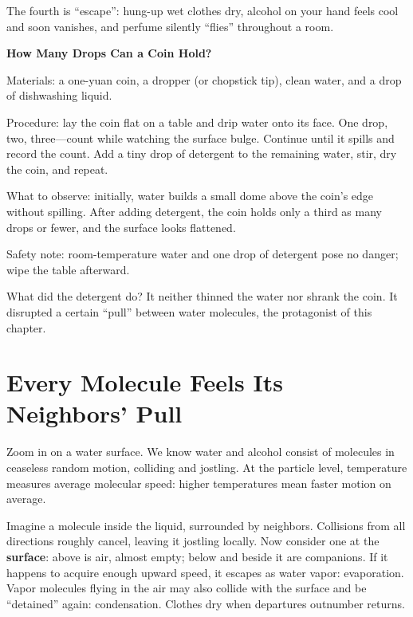 The fourth is ``escape'': hung-up wet clothes dry, alcohol on your hand feels cool and soon vanishes, and perfume silently ``flies'' throughout a room.

\begin{shiyan}
\textbf{How Many Drops Can a Coin Hold?}

Materials: a one-yuan coin, a dropper (or chopstick tip), clean water, and a drop of dishwashing liquid.

Procedure: lay the coin flat on a table and drip water onto its face. One drop, two, three---count while watching the surface bulge. Continue until it spills and record the count. Add a tiny drop of detergent to the remaining water, stir, dry the coin, and repeat.

What to observe: initially, water builds a small dome above the coin's edge without spilling. After adding detergent, the coin holds only a third as many drops or fewer, and the surface looks flattened.

Safety note: room-temperature water and one drop of detergent pose no danger; wipe the table afterward.
\end{shiyan}

What did the detergent do? It neither thinned the water nor shrank the coin. It disrupted a certain ``pull'' between water molecules, the protagonist of this chapter.

\section{Every Molecule Feels Its Neighbors' Pull}

Zoom in on a water surface. We know water and alcohol consist of molecules in ceaseless random motion, colliding and jostling. At the particle level, temperature measures average molecular speed: higher temperatures mean faster motion on average.

Imagine a molecule inside the liquid, surrounded by neighbors. Collisions from all directions roughly cancel, leaving it jostling locally. Now consider one at the \textbf{surface}: above is air, almost empty; below and beside it are companions. If it happens to acquire enough upward speed, it escapes as water vapor: evaporation. Vapor molecules flying in the air may also collide with the surface and be ``detained'' again: condensation. Clothes dry when departures outnumber returns.

\begin{center}
\end{center}


